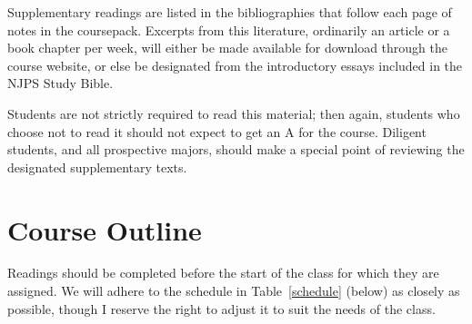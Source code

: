 \documentclass[titlepage]{article}
\begin{document}
Supplementary readings are listed in the bibliographies that follow each
page of notes in the coursepack. Excerpts from this literature,
ordinarily an article or a book chapter per week, will either be made
available for download through the course website, or else be designated
from the introductory essays included in the NJPS Study Bible.

Students are not strictly required to read this material; then again,
students who choose not to read it should not expect to get an A for the
course.
Diligent students, and all prospective majors, should make a special
point of reviewing the designated supplementary texts.

\section{Course Outline}
\label{outline}

Readings should be completed before the start of the class for which
they are assigned. We will adhere to the schedule in
Table~\ref{schedule} (below) as closely as possible, though I reserve
the right to adjust it to suit the needs of the class.

\end{document}
